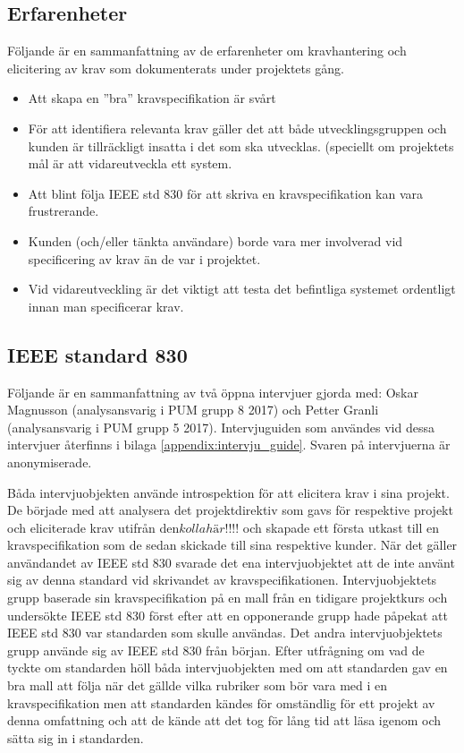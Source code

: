 \subsection{Erfarenheter}
Följande är en sammanfattning av de erfarenheter om kravhantering och elicitering av krav som dokumenterats under projektets gång.
\begin{itemize}
	\item Att skapa en ”bra” kravspecifikation är svårt
	\item För att identifiera relevanta krav gäller det att både utvecklingsgruppen och kunden är tillräckligt insatta i det som ska utvecklas. (speciellt om projektets mål är att vidareutveckla ett system.
	\item Att blint följa IEEE std 830 för att skriva en kravspecifikation kan vara frustrerande.
	\item Kunden (och/eller tänkta användare) borde vara mer involverad vid specificering av krav än de var i projektet.
	\item Vid vidareutveckling är det viktigt att testa det befintliga systemet ordentligt innan man specificerar krav.
\end{itemize}

\subsection{IEEE standard 830}
Följande är en sammanfattning av två öppna intervjuer gjorda med: Oskar Magnusson (analysansvarig i PUM grupp 8 2017) och Petter Granli (analysansvarig i PUM grupp 5 2017). Intervjuguiden som användes vid dessa intervjuer återfinns i bilaga \ref{appendix:intervju_guide}. Svaren på intervjuerna är anonymiserade.  

Båda intervjuobjekten använde introspektion för att elicitera krav i sina projekt. De började med att analysera det projektdirektiv som gavs för respektive projekt och eliciterade krav utifrån den$ kolla här!!!!$ och skapade ett första utkast till en kravspecifikation som de sedan skickade till sina respektive kunder. När det gäller användandet av IEEE std 830 svarade det ena intervjuobjektet att de inte använt sig av denna standard vid skrivandet av kravspecifikationen. Intervjuobjektets grupp baserade sin kravspecifikation på en mall från en tidigare projektkurs och undersökte IEEE std 830 först efter att en opponerande grupp hade påpekat att IEEE std 830 var standarden som skulle användas. Det andra intervjuobjektets grupp använde sig av IEEE std 830 från början. Efter utfrågning om vad de tyckte om standarden höll båda intervjuobjekten med om att standarden gav en bra mall att följa när det gällde vilka rubriker som bör vara med i en kravspecifikation men att standarden kändes för omständlig för ett projekt av denna omfattning och att de kände att det tog för lång tid att läsa igenom och sätta sig in i standarden.          

